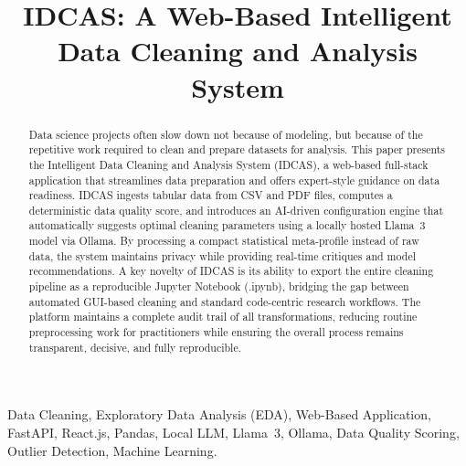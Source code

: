 \documentclass[conference]{IEEEtran}
\begin{document}
\title{IDCAS: A Web-Based Intelligent Data Cleaning and Analysis System}

\author{
\and
{}
}

\maketitle

\begin{abstract}
Data science projects often slow down not because of modeling, but because of the repetitive work required to clean and prepare datasets for analysis. This paper presents the Intelligent Data Cleaning and Analysis System (IDCAS), a web-based full-stack application that streamlines data preparation and offers expert-style guidance on data readiness. IDCAS ingests tabular data from CSV and PDF files, computes a deterministic data quality score, and introduces an AI-driven configuration engine that automatically suggests optimal cleaning parameters using a locally hosted Llama~3 model via Ollama. By processing a compact statistical meta-profile instead of raw data, the system maintains privacy while providing real-time critiques and model recommendations. A key novelty of IDCAS is its ability to export the entire cleaning pipeline as a reproducible Jupyter Notebook (.ipynb), bridging the gap between automated GUI-based cleaning and standard code-centric research workflows. The platform maintains a complete audit trail of all transformations, reducing routine preprocessing work for practitioners while ensuring the overall process remains transparent, decisive, and fully reproducible.
\end{abstract}

\begin{IEEEkeywords}
Data Cleaning, Exploratory Data Analysis (EDA), Web-Based Application, FastAPI, React.js, Pandas, Local LLM, Llama~3, Ollama, Data Quality Scoring, Outlier Detection, Machine Learning.
\end{IEEEkeywords}
\end{document}

